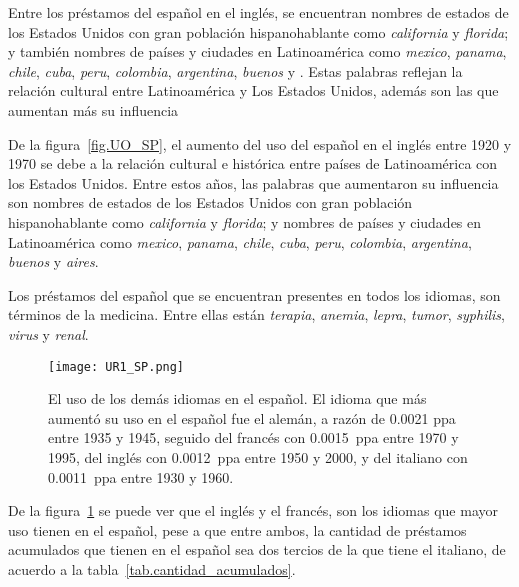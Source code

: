 Entre los préstamos del español en el inglés, se encuentran nombres de 
estados de los Estados Unidos con gran población hispanohablante como \textit{california} y \textit{florida};  y también nombres de países y ciudades en Latinoamérica como \textit{mexico}, \textit{panama}, \textit{chile}, \textit{cuba}, \textit{peru}, \textit{colombia}, \textit{argentina}, \textit{buenos} y . Estas palabras reflejan la relación cultural entre Latinoamérica y Los Estados Unidos, además son las que aumentan más su influencia 


De la figura~\ref{fig.UO_SP}, el aumento del uso del español en el inglés entre 1920 y 1970 se debe a la relación cultural e histórica entre países de Latinoamérica con los Estados Unidos. Entre estos años, las palabras que aumentaron su influencia son  nombres de estados de los Estados Unidos con gran población hispanohablante como \textit{california} y \textit{florida};  y nombres de países y ciudades en Latinoamérica como \textit{mexico}, \textit{panama}, \textit{chile}, \textit{cuba}, \textit{peru}, \textit{colombia}, \textit{argentina}, \textit{buenos} y \textit{aires}.

Los préstamos del español que se encuentran presentes en todos los idiomas, son términos de la medicina. Entre ellas están \textit{terapia}, \textit{anemia}, \textit{lepra}, \textit{tumor}, \textit{syphilis}, \textit{virus} y \textit{renal}.
 
\label{SP-D}

		
\begin{figure}[h!] %
	\centering
	\texttt{[image: UR1\_SP.png]}
	\caption{El uso de los demás idiomas en el español. El idioma que más aumentó su uso en el español fue el alemán, a razón de 0.0021 ppa entre 1935 y 1945, seguido del francés con 0.0015~ppa entre 1970 y 1995,  del inglés con 0.0012~ppa entre 1950 y 2000, y del italiano con 0.0011~ppa entre 1930 y 1960.}
	\label{fig.UR_SP}
\end{figure}

De la figura~\ref{fig.UR_SP} se puede ver que el inglés y el francés, son los idiomas que mayor uso tienen en el español, pese a que entre ambos, la cantidad de préstamos acumulados que tienen en el español sea dos tercios de la que tiene el italiano, de acuerdo a la tabla~\ref{tab.cantidad_acumulados}.



